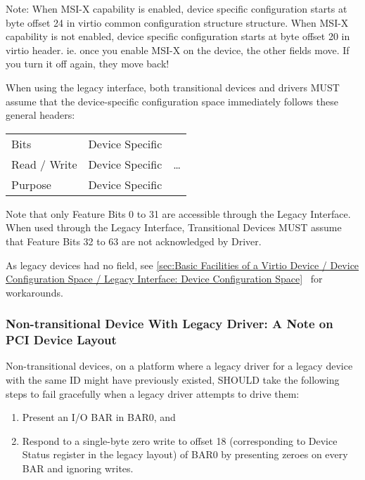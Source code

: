 Note: When MSI-X capability is enabled, device specific configuration starts at
byte offset 24 in virtio common configuration structure structure. When MSI-X capability is not
enabled, device specific configuration starts at byte offset 20 in virtio
header.  ie. once you enable MSI-X on the device, the other fields move.
If you turn it off again, they move back!

When using the legacy interface, both transitional
devices and drivers MUST assume that
the device-specific configuration space
immediately follows these general headers:

\begin{tabular}{|l||l|l|}
\hline
Bits & Device Specific & \multirow{3}{*}{\ldots} \\
\cline{1-2}
Read / Write & Device Specific & \\
\cline{1-2}
Purpose & Device Specific & \\
\hline
\end{tabular}

Note that only Feature Bits 0 to 31 are accessible through the
Legacy Interface. When used through the Legacy Interface,
Transitional Devices MUST assume that Feature Bits 32 to 63
are not acknowledged by Driver.

As legacy devices had no  field,
see \ref{sec:Basic Facilities of a Virtio Device / Device
Configuration Space / Legacy Interface: Device Configuration
Space}~ for workarounds.

\subsubsection{Non-transitional Device With Legacy Driver: A Note
on PCI Device Layout}\label{sec:Virtio Transport Options / Virtio
Over PCI Bus / PCI Device Layout / Non-transitional Device With
Legacy Driver: A Note on PCI Device Layout}

Non-transitional devices, on a platform where a legacy driver for
a legacy device with the same ID might have previously existed,
SHOULD take the following steps to fail gracefully when a legacy
driver attempts to drive them:

\begin{enumerate}
\item Present an I/O BAR in BAR0, and
\item Respond to a single-byte zero write to offset 18
   (corresponding to Device Status register in the legacy layout)
   of BAR0 by presenting zeroes on every BAR and ignoring writes.
\end{enumerate}

